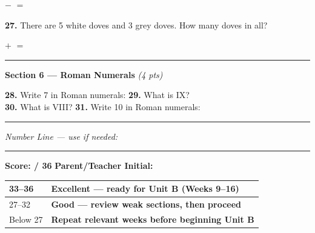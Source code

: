 \documentclass[12pt, letterpaper]{article}
\newcommand{\answerline}{\underline{\hspace{2.5cm}}}
\newcommand{\numbox}{\fbox{\hspace{0.6cm}\vphantom{0}}}
\begin{document}
\medskip
\hspace{2em} \numbox \; $-$ \; \numbox \; $=$ \; \numbox

\bigskip
\noindent\textbf{27.} There are 5 white doves and 3 grey doves. How many doves in all?

\medskip
\hspace{2em} \numbox \; $+$ \; \numbox \; $=$ \; \numbox

\bigskip
\noindent\textcolor{scholared}{\rule{\linewidth}{0.4pt}}

\noindent\textcolor{scholared}{\large\textbf{Section 6 — Roman Numerals}} \hfill \textit{(4 pts)}

\bigskip
\noindent\textbf{28.} Write 7 in Roman numerals: \hfill \answerline \hspace{1cm}
\textbf{29.} What is IX? \hfill \answerline \\[8pt]
\noindent\textbf{30.} What is VIII? \hfill \answerline \hspace{1cm}
\textbf{31.} Write 10 in Roman numerals: \hfill \answerline

\bigskip
\noindent\textcolor{scholared}{\rule{\linewidth}{0.4pt}}

\begin{center}
\textit{Number Line — use if needed:}\\[6pt]
\end{center}

\bigskip
\noindent\textcolor{scholared}{\rule{\linewidth}{1pt}}

\begin{scorebox}
\begin{center}
\large\textbf{Score: \answerline / 36} \hspace{2cm}
\textbf{Parent/Teacher Initial: \answerline}\\[8pt]
\renewcommand{\arraystretch}{1.3}
\begin{tabular}{|l|l|}
\hline
33–36 & \textcolor{scholagreen}{\textbf{Excellent — ready for Unit B (Weeks 9–16)}} \\
\hline
27–32 & \textcolor{scholablue}{\textbf{Good — review weak sections, then proceed}} \\
\hline
Below 27 & \textcolor{scholared}{\textbf{Repeat relevant weeks before beginning Unit B}} \\
\hline
\end{tabular}
\end{center}
\end{scorebox}
\end{document}
